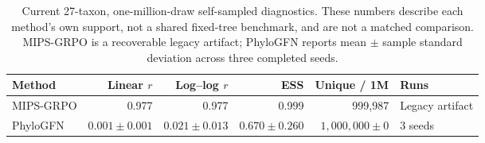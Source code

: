\begin{table}[htbp]
\centering
\caption{Current 27-taxon, one-million-draw self-sampled diagnostics. These
numbers describe each method's own support, not a shared fixed-tree benchmark,
and are not a matched comparison. MIPS-GRPO is a recoverable legacy artifact;
PhyloGFN reports mean \(\pm\) sample standard deviation across three completed
seeds.}
\label{tab:phylo-27-main}
\begin{tabular}{lrrrrl}
\toprule
Method & Linear \(r\) & Log--log \(r\) & ESS & Unique / 1M & Runs \\
\midrule
MIPS-GRPO & 0.977 & 0.977 & 0.999 & 999,987 & Legacy artifact \\
PhyloGFN & $0.001\pm0.001$ & $0.021\pm0.013$ & $0.670\pm0.260$ & $1{,}000{,}000\pm0$ & 3 seeds \\
\bottomrule
\end{tabular}
\end{table}
